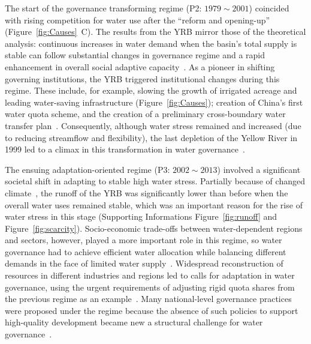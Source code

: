 The start of the governance transforming regime (P2: $1979 \sim 2001$) coincided with rising competition for water use after the ``reform and opening-up'' (Figure~\ref{fig:Causes}~C).
The results from the YRB mirror those of the theoretical analysis: continuous increases in water demand when the basin's total supply is stable can follow substantial changes in governance regime and a rapid enhancement in overall social adaptive capacity~\cite{loch2020}.
As a pioneer in shifting governing institutions, the YRB triggered institutional changes during this regime. These include, for example, slowing the growth of irrigated acreage and leading water-saving infrastructure (Figure~\ref{fig:Causes}); creation of China's first water quota scheme, and the creation of a preliminary cross-boundary water transfer plan~\cite{wang2019e,long2020,nickum2021}.
Consequently, although water stress remained and increased (due to reducing streamflow and flexibility), the last depletion of the Yellow River in 1999 led to a climax in this transformation in water governance~\cite{wang2019e}.

The ensuing adaptation-oriented regime (P3: $2002 \sim 2013$) involved a significant societal shift in adapting to stable high water stress.
Partially because of changed climate~\cite{han2023,liu2020c}, the runoff of the YRB was significantly lower than before when the overall water uses remained stable, which was an important reason for the rise of water stress in this stage (Supporting Informations Figure~\ref{fig:runoff} and Figure~\ref{fig:scarcity}).
Socio-economic trade-offs between water-dependent regions and sectors, however, played a more important role in this regime, so water governance had to achieve efficient water allocation while balancing different demands in the face of limited water supply~\cite{dalin2015,song2022}.
Widespread reconstruction of resources in different industries and regions led to calls for adaptation in water governance, using the urgent requirements of adjusting rigid quota shares from the previous regime as an example~\cite{wang2019e}.
Many national-level governance practices were proposed under the regime because the absence of such policies to support high-quality development became new a structural challenge for water governance~\cite{konar2019}.

